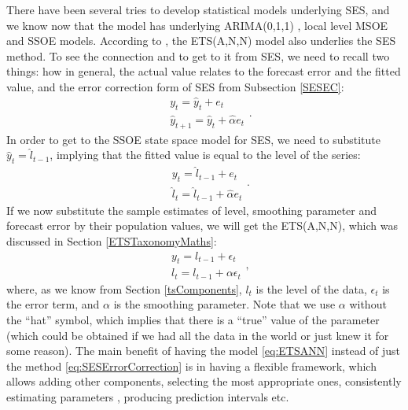 \documentclass[]{book}
\theoremstyle{definition}
\theoremstyle{definition}
\theoremstyle{definition}
\theoremstyle{definition}
\theoremstyle{remark}
\begin{document}
There have been several tries to develop statistical models underlying SES, and we know now that the model has underlying ARIMA(0,1,1) \citep{Muth1960}, local level MSOE \citep[Multiple Source of Error,][]{Muth1960} and SSOE \citep[Single Source of Error,][]{Snyder1985} models. According to \citet{Hyndman2002}, the ETS(A,N,N) model also underlies the SES method. To see the connection and to get to it from SES, we need to recall two things: how in general, the actual value relates to the forecast error and the fitted value, and the error correction form of SES from Subsection \ref{SESEC}:
\begin{equation}
  \begin{aligned}
    & y_t = \hat{y}_{t} + e_t \\
    & \hat{y}_{t+1} = \hat{y}_{t} + \hat{\alpha} e_{t}
  \end{aligned} .
  \label{eq:ETSANNDerivation01}
\end{equation}
In order to get to the SSOE state space model for SES, we need to substitute \(\hat{y}_t=\hat{l}_{t-1}\), implying that the fitted value is equal to the level of the series:
\begin{equation}
  \begin{aligned}
    & y_t = \hat{l}_{t-1} + e_t \\
    & \hat{l}_{t} = \hat{l}_{t-1} + \hat{\alpha} e_{t}
  \end{aligned} .
  \label{eq:ETSANN01}
\end{equation}
If we now substitute the sample estimates of level, smoothing parameter and forecast error by their population values, we will get the ETS(A,N,N), which was discussed in Section \ref{ETSTaxonomyMaths}:
\begin{equation}
  \begin{aligned}
    & y_{t} = l_{t-1} + \epsilon_t \\
    & l_t = l_{t-1} + \alpha \epsilon_t
  \end{aligned} ,
  \label{eq:ETSANN}
\end{equation}
where, as we know from Section \ref{tsComponents}, \(l_t\) is the level of the data, \(\epsilon_t\) is the error term, and \(\alpha\) is the smoothing parameter. Note that we use \(\alpha\) without the ``hat'' symbol, which implies that there is a ``true'' value of the parameter (which could be obtained if we had all the data in the world or just knew it for some reason). The main benefit of having the model \eqref{eq:ETSANN} instead of just the method \eqref{eq:SESErrorCorrection} is in having a flexible framework, which allows adding other components, selecting the most appropriate ones, consistently estimating parameters \citep[see Section 4.3 of][]{SvetunkovSBA}, producing prediction intervals etc.
\end{document}
